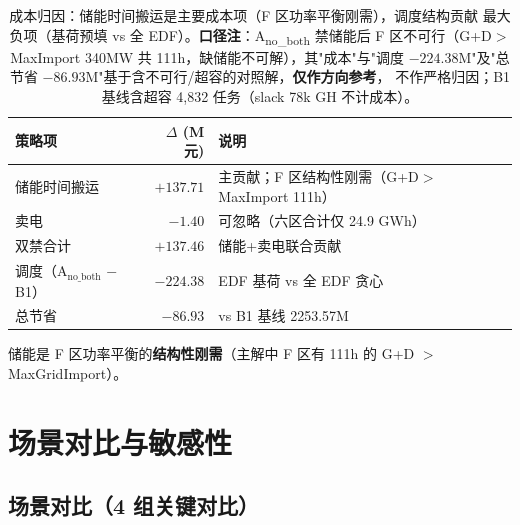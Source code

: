 \documentclass{internal-report}
\begin{document}
\begin{table}[H]
\centering
\footnotesize
\begin{tabular}{lrl}
\toprule
策略项 & $\Delta$ (M元) & 说明 \\
\midrule
储能时间搬运 & $+137.71$ & 主贡献；F 区结构性刚需（G+D$>$MaxImport 111h） \\
卖电 & $-1.40$ & 可忽略（六区合计仅 24.9 GWh） \\
双禁合计 & $+137.46$ & 储能+卖电联合贡献 \\
调度（A$_{\text{no\_both}}$ $-$ B1） & $-224.38$ & EDF 基荷 vs 全 EDF 贪心 \\
\midrule
总节省 & $-86.93$ & vs B1 基线 2253.57M \\
\bottomrule
\end{tabular}
\caption{成本归因：储能时间搬运是主要成本项（F 区功率平衡刚需），调度结构贡献
最大负项（基荷预填 vs 全 EDF）。\textbf{口径注}：A\textsubscript{no\_both} 禁储能后
F 区不可行（G+D$>$MaxImport 340MW 共 111h，缺储能不可解），其"成本"与"调度
$-224.38$M"及"总节省 $-86.93$M"基于含不可行/超容的对照解，\textbf{仅作方向参考}，
不作严格归因；B1 基线含超容 4,832 任务（slack 78k GH 不计成本）。}
\label{tab:decomp}
\end{table}

储能是 F 区功率平衡的\textbf{结构性刚需}（主解中 F 区有 111h 的 G+D $>$ MaxGridImport）。

\section{场景对比与敏感性}

\subsection{场景对比（4 组关键对比）}
\end{document}
